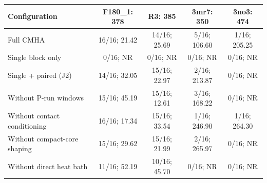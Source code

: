 \begin{tabular}{@{}lcccc@{}}
\toprule
Configuration & F180\_1: 378 & R3: 385 & 3mr7: 350 & 3no3: 474 \\
\midrule
Full CMHA & 16/16; 21.42 & 14/16; 25.69 & 5/16; 106.60 & 1/16; 205.25 \\
Single block only & 0/16; NR & 0/16; NR & 0/16; NR & 0/16; NR \\
Single + paired (J2) & 14/16; 32.05 & 15/16; 22.97 & 2/16; 213.87 & 0/16; NR \\
Without P-run windows & 15/16; 45.19 & 15/16; 12.61 & 3/16; 168.22 & 0/16; NR \\
Without contact conditioning & 16/16; 17.34 & 15/16; 33.54 & 1/16; 246.90 & 1/16; 264.30 \\
Without compact-core shaping & 15/16; 29.62 & 15/16; 21.99 & 2/16; 265.97 & 0/16; NR \\
Without direct heat bath & 11/16; 52.19 & 10/16; 45.70 & 0/16; NR & 0/16; NR \\
\bottomrule
\end{tabular}
